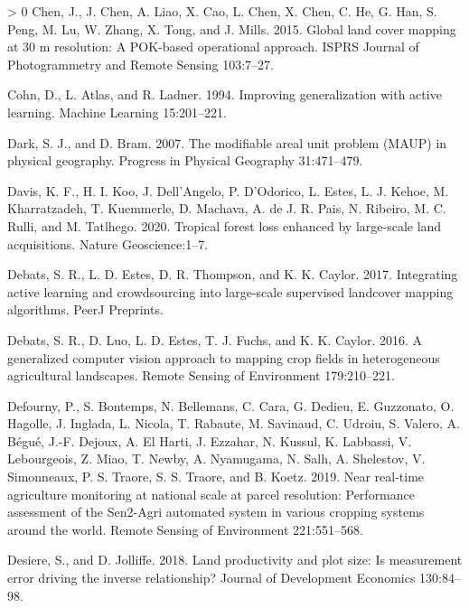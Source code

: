 \documentclass[11pt,a4paper]{article}
\newlength{\cslhangindent}
\newenvironment{CSLReferences}[3] %
 {%
  \setlength{\parindent}{0pt}
  \ifodd #1 \everypar{\setlength{\hangindent}{\cslhangindent}}\ignorespaces\fi
  \ifnum #2 > 0
  \setlength{\parskip}{#2\baselineskip}
  \fi
 }%
 {}
\begin{document}
\begin{CSLReferences}{1}{0}
\leavevmode\hypertarget{ref-ChenGloballandcover2015}{}%
Chen, J., J. Chen, A. Liao, X. Cao, L. Chen, X. Chen, C. He, G. Han, S.
Peng, M. Lu, W. Zhang, X. Tong, and J. Mills. 2015. Global land cover
mapping at 30 m resolution: {A POK}-based operational approach. ISPRS
Journal of Photogrammetry and Remote Sensing 103:7--27.

\leavevmode\hypertarget{ref-cohnImprovingGeneralizationActive1994}{}%
Cohn, D., L. Atlas, and R. Ladner. 1994. Improving generalization with
active learning. Machine Learning 15:201--221.

\leavevmode\hypertarget{ref-Darkmodifiablearealunit2007}{}%
Dark, S. J., and D. Bram. 2007. The modifiable areal unit problem
({MAUP}) in physical geography. Progress in Physical Geography
31:471--479.

\leavevmode\hypertarget{ref-davisTropicalForestLoss2020}{}%
Davis, K. F., H. I. Koo, J. Dell'Angelo, P. D'Odorico, L. Estes, L. J.
Kehoe, M. Kharratzadeh, T. Kuemmerle, D. Machava, A. de J. R. Pais, N.
Ribeiro, M. C. Rulli, and M. Tatlhego. 2020. Tropical forest loss
enhanced by large-scale land acquisitions. Nature Geoscience:1--7.

\leavevmode\hypertarget{ref-DebatsIntegratingactivelearning2017}{}%
Debats, S. R., L. D. Estes, D. R. Thompson, and K. K. Caylor. 2017.
Integrating active learning and crowdsourcing into large-scale
supervised landcover mapping algorithms. {PeerJ Preprints}.

\leavevmode\hypertarget{ref-Debatsgeneralizedcomputervision2016}{}%
Debats, S. R., D. Luo, L. D. Estes, T. J. Fuchs, and K. K. Caylor. 2016.
A generalized computer vision approach to mapping crop fields in
heterogeneous agricultural landscapes. Remote Sensing of Environment
179:210--221.

\leavevmode\hypertarget{ref-Defournyrealtimeagriculturemonitoring2019}{}%
Defourny, P., S. Bontemps, N. Bellemans, C. Cara, G. Dedieu, E.
Guzzonato, O. Hagolle, J. Inglada, L. Nicola, T. Rabaute, M. Savinaud,
C. Udroiu, S. Valero, A. Bégué, J.-F. Dejoux, A. El Harti, J. Ezzahar,
N. Kussul, K. Labbassi, V. Lebourgeois, Z. Miao, T. Newby, A. Nyamugama,
N. Salh, A. Shelestov, V. Simonneaux, P. S. Traore, S. S. Traore, and B.
Koetz. 2019. Near real-time agriculture monitoring at national scale at
parcel resolution: {Performance} assessment of the {Sen2}-{Agri}
automated system in various cropping systems around the world. Remote
Sensing of Environment 221:551--568.

\leavevmode\hypertarget{ref-desiereLandProductivityPlot2018}{}%
Desiere, S., and D. Jolliffe. 2018. Land productivity and plot size:
{Is} measurement error driving the inverse relationship? Journal of
Development Economics 130:84--98.


\end{CSLReferences}
\end{document}
